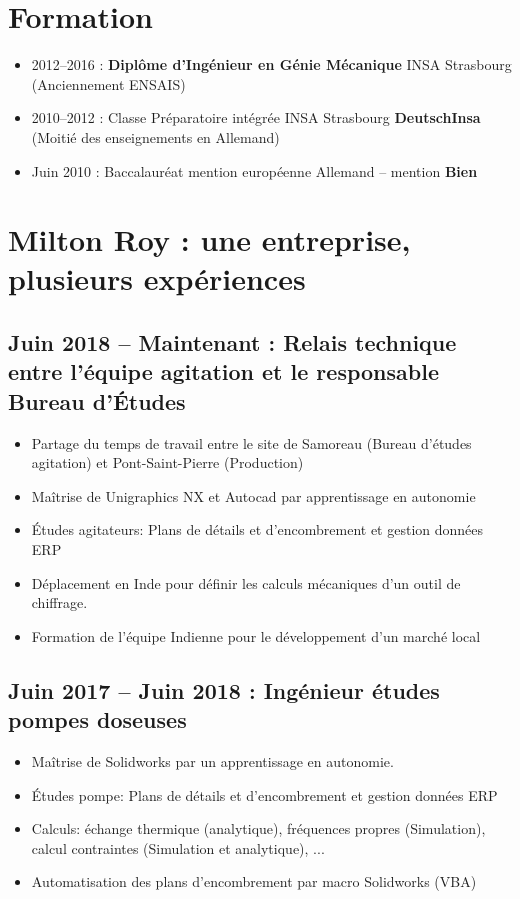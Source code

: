 \documentclass[10pt,a4paper,sans]{article}
\begin{document}
\begin{minipage}[t]{0.68\textwidth}
    \vspace{0.15cm}
    \section{Formation}
        \begin{itemize}
            \item{2012--2016 : \textbf{Diplôme d'Ingénieur en Génie Mécanique} INSA Strasbourg (Anciennement ENSAIS)}
            \item{2010--2012 : Classe Préparatoire intégrée INSA Strasbourg \textbf{DeutschInsa} \newline (Moitié des enseignements en Allemand)}
            \item{Juin 2010 : Baccalauréat mention européenne Allemand -- mention \textbf{Bien}}
        \end{itemize}

    \section{Milton Roy : une entreprise, plusieurs expériences}
    \subsection{Juin 2018 -- Maintenant : Relais technique entre l'équipe agitation et le responsable Bureau d'Études}
    \begin{itemize}%
        \item{Partage du temps de travail entre le site de Samoreau (Bureau d'études agitation) et Pont-Saint-Pierre (Production)}
        \item{Maîtrise de Unigraphics NX et Autocad par apprentissage en autonomie}
        \item{Études agitateurs: Plans de détails et d'encombrement et gestion données ERP }
        \item{Déplacement en Inde pour définir les calculs mécaniques d'un outil de chiffrage.} 
        \item{Formation de l’équipe Indienne pour le développement d’un marché local}
    \end{itemize}

    \subsection{Juin 2017 -- Juin 2018 : Ingénieur études pompes doseuses}
    \begin{itemize}
        \item{Maîtrise de Solidworks par un apprentissage en autonomie.}
        \item{Études pompe: Plans de détails et d'encombrement et gestion données ERP }
        \item{Calculs: échange thermique (analytique), fréquences propres (Simulation), calcul contraintes (Simulation et analytique), ...}
        \item{Automatisation des plans d’encombrement par macro Solidworks (VBA)}
    \end{itemize}


\end{minipage}
\end{document}

